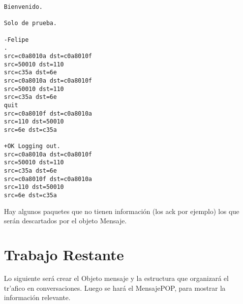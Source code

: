 \documentclass[titlepage]{article}
\begin{document}
\begin{verbatim}
Bienvenido.

Solo de prueba.

-Felipe
.
src=c0a8010a dst=c0a8010f
src=50010 dst=110
src=c35a dst=6e
src=c0a8010a dst=c0a8010f
src=50010 dst=110
src=c35a dst=6e
quit
src=c0a8010f dst=c0a8010a
src=110 dst=50010
src=6e dst=c35a

+OK Logging out.
src=c0a8010a dst=c0a8010f
src=50010 dst=110
src=c35a dst=6e
src=c0a8010f dst=c0a8010a
src=110 dst=50010
src=6e dst=c35a
\end{verbatim}
Hay algunos paquetes que no tienen informaci\'on (los ack por ejemplo) los que
ser\'an descartados por el objeto Mensaje.
\section{Trabajo Restante}
Lo siguiente ser\'a crear el Objeto mensaje y la estructura que organizar\'a el
tr'afico en conversaciones. Luego se har\'a el MensajePOP, para mostrar la
informaci\'on relevante.
\end{document}
